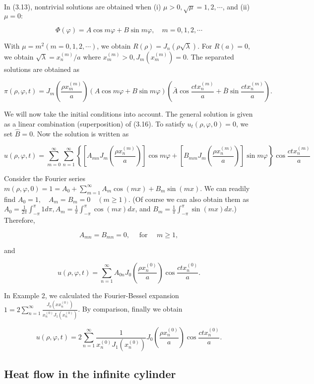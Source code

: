 In (3.13), nontrivial solutions are obtained when (i) $\mu>0, \sqrt{\mu}=1,2, \cdots$, and (ii) $\mu=0:$

$$
\Phi(\varphi)=A \cos m \varphi+B \sin m \varphi, \quad m=0,1,2, \cdots
$$


With $\mu=m^2(m=0,1,2, \cdots)$, we obtain $R(\rho)=J_n(\rho \sqrt{\lambda})$. For $R(a)=0$, we obtain $\sqrt{\lambda}=x_n^{(m)} / a$ where $x_m^{(m)}>0, J_m\left(x_m^{(m)}\right)=0$. The separated solutions are obtained as

$$
\pi(\rho, \varphi, t)=J_m\left(\frac{\rho x_m^{(m)}}{a}\right)(A \cos m \varphi+B \sin m \varphi)\left(\bar{A} \cos \frac{c t x_n^{(m)}}{a}+\bar{B} \sin \frac{c t x_n^{(m)}}{a}\right) .
$$


We will now take the initial conditions into account. The general solution is given as a linear combination (superposition) of (3.16). To satisfy $u_t(\rho, \varphi, 0)=0$, we set $\hat{B}=0$. Now the solution is written as

$$
u(\rho, \varphi, t)=\sum_{m=0}^{\infty} \sum_{n=1}^{\infty}\left\{\left[A_{m n} J_m\left(\frac{\rho x_n^{(m)}}{a}\right)\right] \cos m \varphi+\left[B_{m m} J_m\left(\frac{\rho x_n^{(m)}}{a}\right)\right] \sin m \varphi\right\} \cos \frac{c t x_n^{(m)}}{a}
$$


Consider the Fourier series $m(\rho, \varphi, 0)=1=A_0+\sum_{m=1}^{\infty} A_m \cos (m x)+B_m \sin (m x)$. We can readily find $A_0=1, \quad A_m=B_m=0 \quad(m \geq 1)$. (Of course we can also obtain them as $A_0=\frac{1}{2 \pi} \int_{-\pi}^\pi 1 d \pi, A_m=\frac{1}{\pi} \int_{-\pi}^\pi \cos (m x) d x$, and $B_m=\frac{1}{\pi} \int_{-\pi}^\pi \sin (m x) d x$.) Therefore,

$$
A_{m n}=B_{m n}=0, \quad \text { for } \quad m \geq 1,
$$

and

$$
u(\rho, \varphi, t)=\sum_{n=1}^{\infty} A_{0 n} J_0\left(\frac{\rho x_n^{(0)}}{a}\right) \cos \frac{c t x_n^{(0)}}{a} .
$$


In Example 2, we calculated the Fourier-Bessel expansion $1=2 \sum_{n=1}^{\infty} \frac{J_0\left(x x_n^{(0)}\right)}{x_n^{(0)} J_1\left(x_n^{(0)}\right)}$. By comparison, finally we obtain

$$
u(\rho, \varphi, t)=2 \sum_{n=1}^{\infty} \frac{1}{x_n^{(0)} J_1\left(x_n^{(0)}\right)} J_0\left(\frac{\rho x_n^{(0)}}{a}\right) \cos \frac{c t x_n^{(0)}}{a} .
$$


\subsection{Heat flow in the infinite cylinder}

